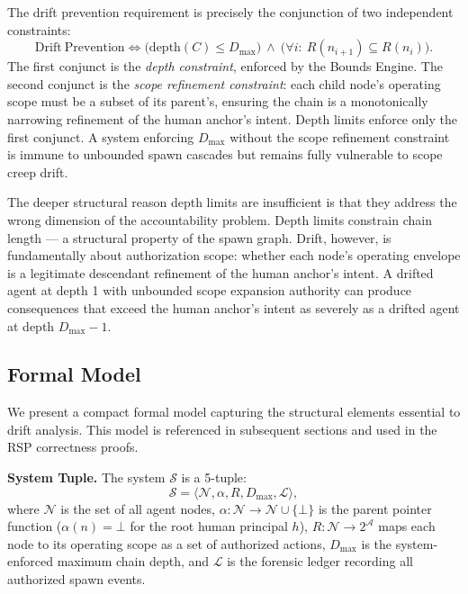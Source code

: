The drift prevention requirement is precisely the conjunction of two independent constraints:
\begin{equation}
\mathrm{Drift\ Prevention} \iff \bigl( \mathrm{depth}(C) \leq D_{\max} \bigr)\ \land\ \bigl( \forall i:\ R(n_{i+1}) \subseteq R(n_i) \bigr).
\label{eq:drift-prevention-constraint}
\end{equation}
The first conjunct is the \emph{depth constraint}, enforced by the Bounds Engine. The second conjunct is the \emph{scope refinement constraint}: each child node's operating scope must be a subset of its parent's, ensuring the chain is a monotonically narrowing refinement of the human anchor's intent. Depth limits enforce only the first conjunct. A system enforcing $D_{\max}$ without the scope refinement constraint is immune to unbounded spawn cascades but remains fully vulnerable to scope creep drift.

The deeper structural reason depth limits are insufficient is that they address the wrong dimension of the accountability problem. Depth limits constrain chain length — a structural property of the spawn graph. Drift, however, is fundamentally about authorization scope: whether each node's operating envelope is a legitimate descendant refinement of the human anchor's intent. A drifted agent at depth 1 with unbounded scope expansion authority can produce consequences that exceed the human anchor's intent as severely as a drifted agent at depth $D_{\max} - 1$.

\subsection{Formal Model}

We present a compact formal model capturing the structural elements essential to drift analysis. This model is referenced in subsequent sections and used in the RSP correctness proofs.

\medskip
\noindent\textbf{System Tuple.}
The system $\mathcal{S}$ is a 5-tuple:
\begin{equation}
\mathcal{S} = \langle \mathcal{N}, \alpha, R, D_{\max}, \mathcal{L} \rangle,
\label{eq:system-model}
\end{equation}
where $\mathcal{N}$ is the set of all agent nodes, $\alpha: \mathcal{N} \rightarrow \mathcal{N} \cup \{\bot\}$ is the parent pointer function ($\alpha(n) = \bot$ for the root human principal $h$), $R: \mathcal{N} \rightarrow 2^{\mathcal{A}}$ maps each node to its operating scope as a set of authorized actions, $D_{\max}$ is the system-enforced maximum chain depth, and $\mathcal{L}$ is the forensic ledger recording all authorized spawn events.

